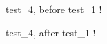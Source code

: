\documentclass{article}
\begin{document}
test_4, before test_1 !



test_4, after test_1 !
\end{document}
